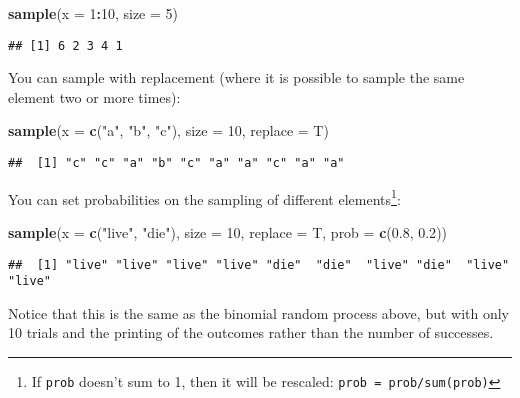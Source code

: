 \documentclass[]{book}
\newenvironment{Shaded}{\begin{snugshade}}{\end{snugshade}}
\newcommand{\KeywordTok}[1]{\textcolor[rgb]{0.13,0.29,0.53}{\textbf{#1}}}
\newcommand{\DataTypeTok}[1]{\textcolor[rgb]{0.13,0.29,0.53}{#1}}
\newcommand{\DecValTok}[1]{\textcolor[rgb]{0.00,0.00,0.81}{#1}}
\newcommand{\FloatTok}[1]{\textcolor[rgb]{0.00,0.00,0.81}{#1}}
\newcommand{\StringTok}[1]{\textcolor[rgb]{0.31,0.60,0.02}{#1}}
\newcommand{\OperatorTok}[1]{\textcolor[rgb]{0.81,0.36,0.00}{\textbf{#1}}}
\newcommand{\NormalTok}[1]{#1}
\let\rmarkdownfootnote\footnote%
\def\footnote{\protect\rmarkdownfootnote}
\theoremstyle{definition}
\theoremstyle{definition}
\theoremstyle{definition}
\theoremstyle{remark}
\begin{document}
\begin{Shaded}
\begin{Highlighting}[]
\KeywordTok{sample}\NormalTok{(}\DataTypeTok{x =} \DecValTok{1}\OperatorTok{:}\DecValTok{10}\NormalTok{, }\DataTypeTok{size =} \DecValTok{5}\NormalTok{)}
\end{Highlighting}
\end{Shaded}

\begin{verbatim}
## [1] 6 2 3 4 1
\end{verbatim}

You can sample with replacement (where it is possible to sample the same
element two or more times):

\begin{Shaded}
\begin{Highlighting}[]
\KeywordTok{sample}\NormalTok{(}\DataTypeTok{x =} \KeywordTok{c}\NormalTok{(}\StringTok{"a"}\NormalTok{, }\StringTok{"b"}\NormalTok{, }\StringTok{"c"}\NormalTok{), }\DataTypeTok{size =} \DecValTok{10}\NormalTok{, }\DataTypeTok{replace =}\NormalTok{ T)}
\end{Highlighting}
\end{Shaded}

\begin{verbatim}
##  [1] "c" "c" "a" "b" "c" "a" "a" "c" "a" "a"
\end{verbatim}

You can set probabilities on the sampling of different
elements\footnote{If \texttt{prob} doesn't sum to 1, then it will be
  rescaled: \texttt{prob\ =\ prob/sum(prob)}}:

\begin{Shaded}
\begin{Highlighting}[]
\KeywordTok{sample}\NormalTok{(}\DataTypeTok{x =} \KeywordTok{c}\NormalTok{(}\StringTok{"live"}\NormalTok{, }\StringTok{"die"}\NormalTok{), }\DataTypeTok{size =} \DecValTok{10}\NormalTok{, }\DataTypeTok{replace =}\NormalTok{ T,}
       \DataTypeTok{prob =} \KeywordTok{c}\NormalTok{(}\FloatTok{0.8}\NormalTok{, }\FloatTok{0.2}\NormalTok{))}
\end{Highlighting}
\end{Shaded}

\begin{verbatim}
##  [1] "live" "live" "live" "live" "die"  "die"  "live" "die"  "live" "live"
\end{verbatim}

Notice that this is the same as the binomial random process above, but
with only 10 trials and the printing of the outcomes rather than the
number of successes.
\end{document}

